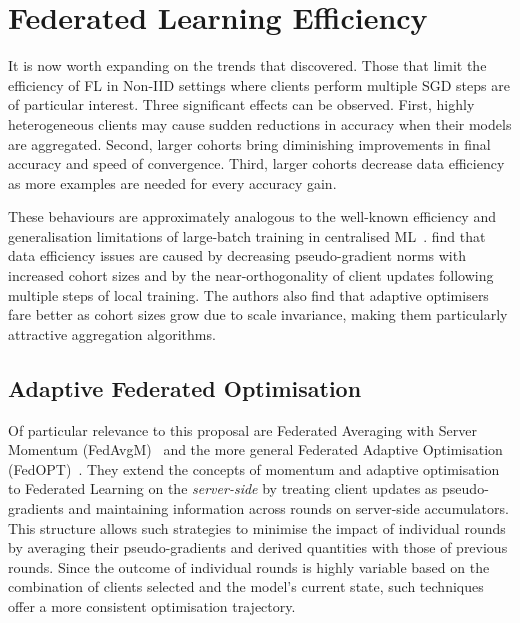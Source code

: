 \section{Federated Learning Efficiency}\label{sec:back:FL_Efficiency}
It is now worth expanding on the trends that \citet{LargeCohorts} discovered. Those that limit the efficiency of FL in Non-IID settings where clients perform multiple SGD steps are of particular interest. Three significant effects can be observed. First, highly heterogeneous clients may cause sudden reductions in accuracy when their models are aggregated. Second, larger cohorts bring diminishing improvements in final accuracy and speed of convergence. Third, larger cohorts decrease data efficiency as more examples are needed for every accuracy gain.

These behaviours are approximately analogous to the well-known efficiency and generalisation limitations of large-batch training in centralised ML~\citep{LargeBatchGenGapSharpMinima}. \citet{LargeCohorts} find that data efficiency issues are caused by decreasing pseudo-gradient norms with increased cohort sizes and by the near-orthogonality of client updates following multiple steps of local training. The authors also find that adaptive optimisers fare better as cohort sizes grow due to scale invariance, making them particularly attractive aggregation algorithms.

\subsection{Adaptive Federated Optimisation}

Of particular relevance to this proposal are Federated Averaging with Server Momentum (FedAvgM)~\citep{FedAvgM} and the more general Federated Adaptive Optimisation (FedOPT)~\citep{FedOPT}. They extend the concepts of momentum and adaptive optimisation~\citep{AdaGrad,Adam,SgdAlgoOverview} to Federated Learning on the \textit{server-side} by treating client updates as pseudo-gradients and maintaining information across rounds on server-side accumulators. This structure allows such strategies to minimise the impact of individual rounds by averaging their pseudo-gradients and derived quantities with those of previous rounds. Since the outcome of individual rounds is highly variable based on the combination of clients selected and the model's current state, such techniques offer a more consistent optimisation trajectory.

